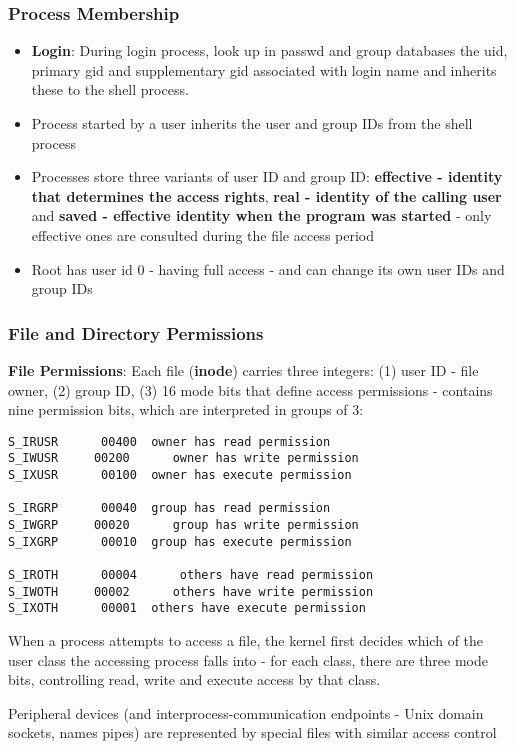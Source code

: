 \documentclass{article}
\begin{document}
\subsubsection{Process Membership}
\begin{itemize}
	\item \textbf{Login}: During login process, look up in passwd and group databases the uid, primary gid and supplementary gid associated with login name and inherits these to the shell process.
	\item Process started by a user inherits the user and group IDs from the shell process
	\item Processes store three variants of user ID and group ID: \textbf{effective - identity that determines the access rights}, \textbf{real - identity of the calling user} and \textbf{saved - effective identity when the program was started} - only effective ones are consulted during the file access period
	\item Root has user id 0 - having full access - and can change its own user IDs and group IDs
\end{itemize}

\subsubsection{File and Directory Permissions}
\textbf{File Permissions}: Each file (\textbf{inode}) carries three integers: (1) user ID - file owner, (2) group ID, (3) 16 mode bits that define access permissions - contains nine permission bits, which are interpreted in groups of 3:
\begin{lstlisting}
S_IRUSR 	 00400 	owner has read permission
S_IWUSR 	00200 	   owner has write permission
S_IXUSR 	 00100 	owner has execute permission

S_IRGRP 	 00040 	group has read permission
S_IWGRP 	00020 	   group has write permission
S_IXGRP 	 00010 	group has execute permission

S_IROTH 	 00004 	    others have read permission
S_IWOTH 	00002 	   others have write permission
S_IXOTH		 00001 	others have execute permission

\end{lstlisting}

When a process attempts to access a file, the kernel first decides which of the user class the accessing process falls into - for each class, there are three mode bits, controlling read, write and execute access by that class.

Peripheral devices (and interprocess-communication endpoints - Unix domain sockets, names pipes) are represented by special files with similar access control
\end{document}

